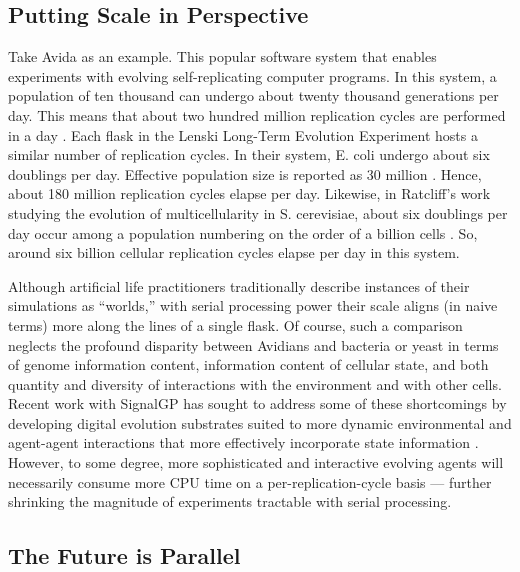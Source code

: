 \subsection{Putting Scale in Perspective}

Take Avida as an example. This popular software system that enables experiments with evolving self-replicating computer programs.
In this system, a population of ten thousand can undergo about twenty thousand generations per day.
This means that about two hundred million replication cycles are performed in a day \cite{ofria2009artificial}.
Each flask in the Lenski Long-Term Evolution Experiment hosts a similar number of replication cycles.
In their system, E. coli undergo about six doublings per day.
Effective population size is reported as 30 million \cite{good2017dynamics}. Hence, about 180 million replication cycles elapse per day.
Likewise, in Ratcliff’s work studying the evolution of multicellularity in S. cerevisiae, about six doublings per day occur among a population numbering on the order of a billion cells \cite{ratcliff2012experimental}.
So, around six billion cellular replication cycles elapse per day in this system.

Although artificial life practitioners traditionally describe instances of their simulations as “worlds,” with serial processing power their scale aligns (in naive terms) more along the lines of a single flask.
Of course, such a comparison neglects the profound disparity between Avidians and bacteria or yeast in terms of genome information content, information content of cellular state, and both quantity and diversity of interactions with the environment and with other cells.
Recent work with SignalGP has sought to address some of these shortcomings by developing digital evolution substrates suited to more dynamic environmental and agent-agent interactions \cite{lalejini2018evolving} that more effectively incorporate state information \cite{lalejini2021tag; lalejini2020case, moreno2019evaluating}.
However, to some degree, more sophisticated and interactive evolving agents will necessarily consume more CPU time on a per-replication-cycle basis --- further shrinking the magnitude of experiments tractable with serial processing.

\subsection{The Future is Parallel}

